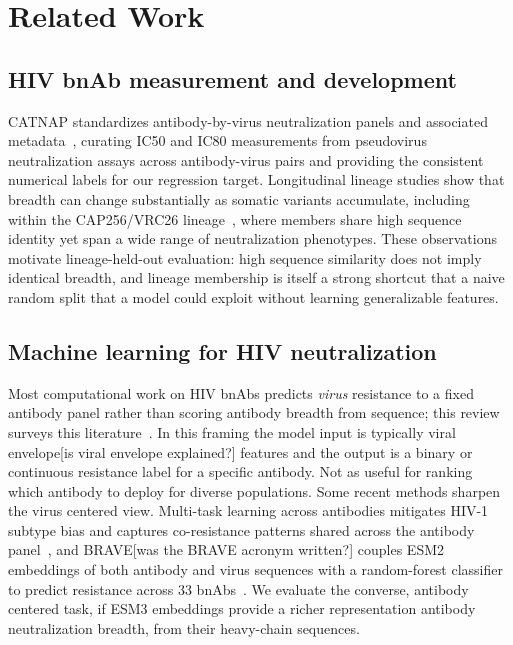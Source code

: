 \section{Related Work}
\label{sec:related}

\subsection{HIV bnAb measurement and development}
CATNAP standardizes antibody-by-virus neutralization panels and associated
metadata~\cite{yoon2015catnap}, curating IC50 and IC80 measurements from
pseudovirus neutralization assays across antibody-virus pairs and
providing the consistent numerical labels for our regression target.
Longitudinal lineage studies show that breadth can change substantially as
somatic variants accumulate, including within the CAP256/VRC26
lineage~\cite{doriarose2014developmental,bhiman2015cap256}, where members share
high sequence identity yet span a wide range of neutralization phenotypes.
These observations motivate lineage-held-out evaluation: high sequence
similarity does not imply identical breadth, and lineage membership is itself a
strong shortcut that a naive random split that a model could exploit without
learning generalizable features.

\subsection{Machine learning for HIV neutralization}
Most computational work on HIV bnAbs predicts \emph{virus} resistance to a fixed
antibody panel rather than scoring antibody breadth from sequence; this
review surveys this literature~\cite{danaila2022review}. In this framing the model
input is typically viral envelope[is viral envelope explained?]
features and the output is a binary or
continuous resistance label for a specific antibody.
Not as useful for ranking which antibody to deploy for diverse
populations. Some recent methods sharpen the virus centered view.
Multi-task learning across antibodies mitigates HIV-1 subtype bias and captures
co-resistance patterns shared across the antibody panel~\cite{igiraneza2024multitask},
and BRAVE[was the BRAVE acronym written?]
couples ESM2 embeddings of both antibody and virus sequences with a
random-forest classifier to predict resistance across 33
bnAbs~\cite{elanbari2025brave}. We evaluate the converse, antibody centered
task, if ESM3 embeddings provide a richer representation
antibody neutralization breadth, from their heavy-chain sequences.


